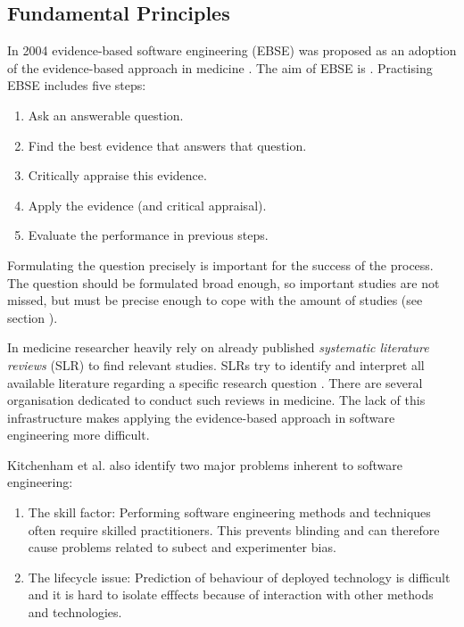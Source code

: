 \subsection{Fundamental Principles}

\newline
In 2004 evidence-based software engineering (EBSE) was proposed as an adoption of the evidence-based approach in medicine \cite{EBSE}. The aim of EBSE is  \cite{Dyba2005}. Practising EBSE includes five steps:
\begin{enumerate}
	\item Ask an answerable question.
	\item Find the best evidence that answers that question.
	\item Critically appraise this evidence.
	\item Apply the evidence (and critical appraisal).
	\item Evaluate the performance in previous steps.
\end{enumerate}
Formulating the question precisely is important for the success of the process. The question should be formulated broad enough, so important studies are not missed, but must be precise enough to cope with the amount of studies (see section ).

In medicine researcher heavily rely on already published \emph{systematic literature reviews} (SLR) to find relevant studies. SLRs try to identify and interpret all available literature regarding a specific research question \cite{keele2007}. There are several organisation dedicated to conduct such reviews in medicine. The lack of this infrastructure makes applying the evidence-based approach in software engineering more difficult.

Kitchenham et al. \cite{EBSE} also identify two major problems inherent to software engineering:
\begin{enumerate}
\item The skill factor: Performing software engineering methods and techniques often require skilled practitioners. This prevents blinding and can therefore cause problems related to subect and experimenter bias.
\item The lifecycle issue: Prediction of behaviour  of deployed technology is difficult and it is hard to isolate efffects because of interaction with other methods and technologies.
\end{enumerate}

\newline

